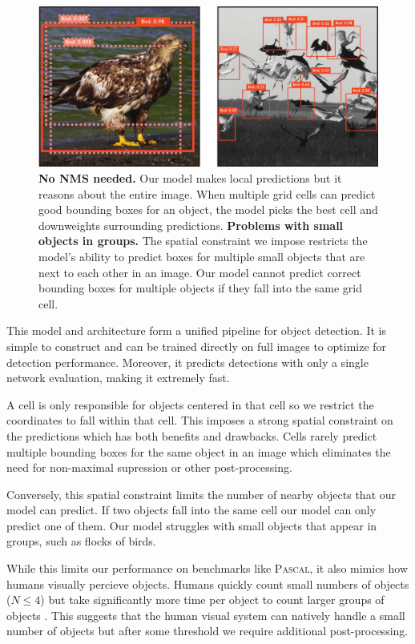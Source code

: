\documentclass{article} %
\begin{document}
\begin{figure}[th]
\begin{center}
        \includegraphics[width=.8\linewidth]{bird}
\end{center}
   \caption{\textbf{No NMS needed.} Our model makes local predictions but it reasons about the entire image. When multiple grid cells can predict good bounding boxes for an object, the model picks the best cell and downweights surrounding predictions. \textbf{Problems with small objects in groups.} The spatial constraint we impose restricts the model's ability to predict boxes for multiple small objects that are next to each other in an image. Our model cannot predict correct bounding boxes for multiple objects if they fall into the same grid cell.}
\label{eagle}
\end{figure}

This model and architecture form a unified pipeline for object detection. It is simple to construct and can be trained directly on full images to optimize for detection performance. Moreover, it predicts detections with only a single network evaluation, making it extremely fast.

A cell is only responsible for objects centered in that cell so we restrict the coordinates to fall within that cell. This imposes a strong spatial constraint on the predictions which has both benefits and drawbacks. Cells rarely predict multiple bounding boxes for the same object in an image which eliminates the need for non-maximal supression or other post-processing.

Conversely, this spatial constraint limits the number of nearby objects that our model can predict. If two objects fall into the same cell our model can only predict one of them. Our model struggles with small objects that appear in groups, such as flocks of birds.

While this limits our performance on benchmarks like \textsc{Pascal}, it also mimics how humans visually percieve objects. Humans quickly count small numbers of objects ($N \le 4$) but take significantly more time per object to count larger groups of objects \cite{piazza2002subitizing}. This suggests that the human visual system can natively handle a small number of objects but after some threshold we require additional post-processing.
\end{document}
